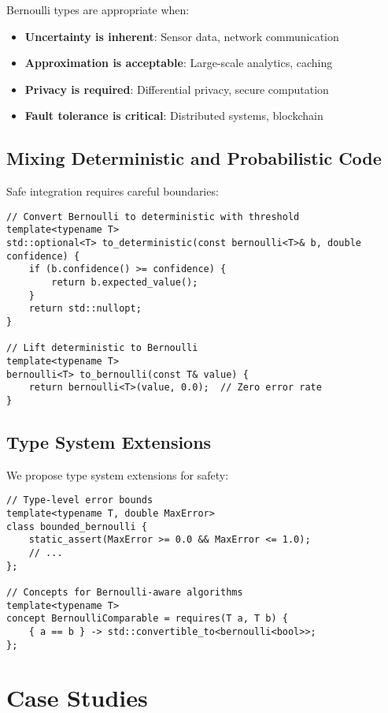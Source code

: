 \documentclass[11pt,final,hidelinks]{article}
\begin{document}
Bernoulli types are appropriate when:
\begin{itemize}
    \item \textbf{Uncertainty is inherent}: Sensor data, network communication
    \item \textbf{Approximation is acceptable}: Large-scale analytics, caching
    \item \textbf{Privacy is required}: Differential privacy, secure computation
    \item \textbf{Fault tolerance is critical}: Distributed systems, blockchain
\end{itemize}

\subsection{Mixing Deterministic and Probabilistic Code}

Safe integration requires careful boundaries:

\begin{verbatim}
// Convert Bernoulli to deterministic with threshold
template<typename T>
std::optional<T> to_deterministic(const bernoulli<T>& b, double confidence) {
    if (b.confidence() >= confidence) {
        return b.expected_value();
    }
    return std::nullopt;
}

// Lift deterministic to Bernoulli
template<typename T>
bernoulli<T> to_bernoulli(const T& value) {
    return bernoulli<T>(value, 0.0);  // Zero error rate
}
\end{verbatim}

\subsection{Type System Extensions}

We propose type system extensions for safety:

\begin{verbatim}
// Type-level error bounds
template<typename T, double MaxError>
class bounded_bernoulli {
    static_assert(MaxError >= 0.0 && MaxError <= 1.0);
    // ...
};

// Concepts for Bernoulli-aware algorithms
template<typename T>
concept BernoulliComparable = requires(T a, T b) {
    { a == b } -> std::convertible_to<bernoulli<bool>>;
};
\end{verbatim}

\section{Case Studies}
\end{document}
